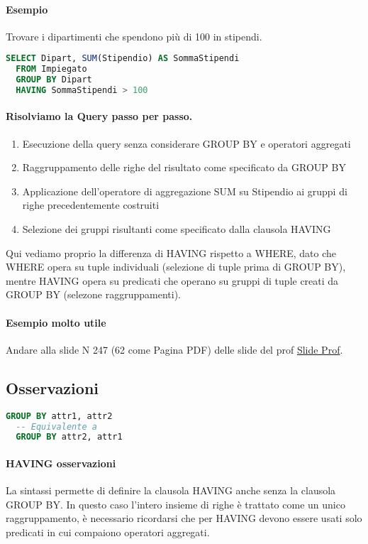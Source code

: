 \paragraph*{Esempio}
Trovare i dipartimenti che spendono più di 100 in stipendi.
\begin{lstlisting}[language=SQL]
  SELECT Dipart, SUM(Stipendio) AS SommaStipendi
  FROM Impiegato
  GROUP BY Dipart
  HAVING SommaStipendi > 100
\end{lstlisting}
\paragraph*{Risolviamo la Query passo per passo.}
\begin{enumerate}
  \item Esecuzione della query senza considerare GROUP BY e operatori
  aggregati
  \item Raggruppamento delle righe del risultato come specificato da GROUP BY
  \item Applicazione dell'operatore di aggregazione SUM su Stipendio ai gruppi di
  righe precedentemente costruiti
  \item Selezione dei gruppi risultanti come specificato dalla clausola HAVING
\end{enumerate}
Qui vediamo proprio la differenza di HAVING rispetto a WHERE, dato che
WHERE opera su tuple individuali (selezione di tuple prima di GROUP BY),
mentre HAVING opera su predicati che operano su gruppi di tuple creati da
GROUP BY (selezone raggruppamenti).
\paragraph*{Esempio molto utile} Andare alla slide N 247 (62 come Pagina PDF)
delle slide del prof \href{https://elearning.unimib.it/pluginfile.php/1533829/mod_resource/content/1/SQL.pdf}{Slide Prof}.
\subsection{Osservazioni}
\begin{lstlisting}[language=SQL]
  GROUP BY attr1, attr2
  -- Equivalente a
  GROUP BY attr2, attr1
\end{lstlisting}
\paragraph*{HAVING osservazioni}
La sintassi permette di definire la clausola HAVING anche senza la clausola GROUP BY.
In questo caso l'intero insieme di righe è trattato come un unico raggruppamento, è
necessario ricordarsi che per HAVING devono essere usati solo predicati in cui
compaiono operatori aggregati.

